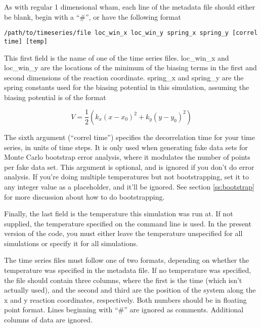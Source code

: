 \documentclass[12pt]{article}
\begin{document}
As with regular 1 dimensional wham, each line of the metadata file should
either be blank, begin with a ``\#'', or have the following format

\begin{footnotesize}
\begin{verbatim}
/path/to/timeseries/file loc_win_x loc_win_y spring_x spring_y [correl time] [temp]
\end{verbatim}
\end{footnotesize}

This first field is the name of one of the time series files.  loc\_win\_x
and loc\_win\_y are the locations of the minimum of the biasing terms in the
first and second dimensions of the reaction coordinate.  spring\_x and
spring\_y are the spring constants used for the biasing potential in this
simulation, assuming the biasing potential is of the format

\begin{equation}
V = \frac{1}{2} ( k_x (x - x_0)^2 + k_y (y -y_0)^2 )
\end{equation}

The sixth argument (``correl time'') specifies the decorrelation time for
your time series, in units of time steps.  It is only used when generating
fake data sets for Monte Carlo bootstrap error analysis, where it modulates
the number of points per fake data set.  This argument is optional, and is
ignored if you don't do error analysis.  If you're doing multiple
temperatures but not bootstrapping, set it to any integer value as a
placeholder, and it'll be ignored.  See section \ref{ss:bootstrap} for more
discussion about how to do bootstrapping.

Finally, the last field is the temperature this simulation was run at.  If
not supplied, the temperature specified on the command line is used.  In
the present version of the code, you must either leave the temperature
unspecified for all simulations or specify it for all simulations.  

The time series files must follow one of two formats, depending on whether
the temperature was specified in the metadata file.  If no temperature was
specified, the file should contain three columns, where the first is the
time (which isn't actually used), and the second and third are the position
of the system along the x and y reaction coordinates, respectively.  Both
numbers should be in floating point format.  Lines beginning with ``\#'' are
ignored as comments.  Additional columns of data are ignored.
\end{document}
